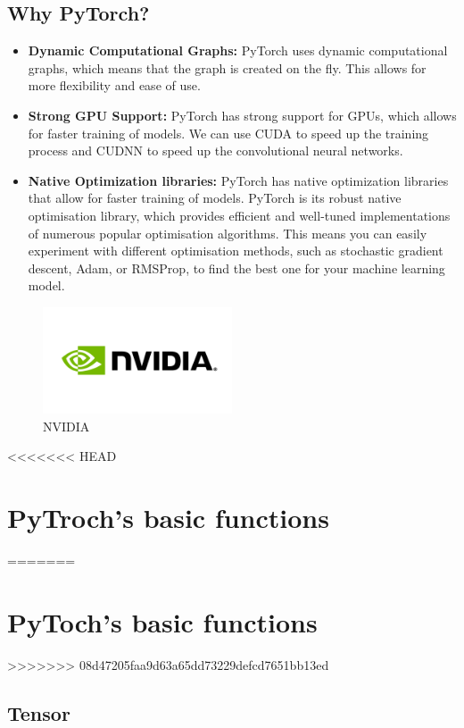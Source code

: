 \documentclass[12pt,hyperref,a4paper,UTF8]{article}
\begin{document}
\subsection{Why PyTorch?}
\begin{itemize}
    \item \textbf{Dynamic Computational Graphs:} PyTorch uses dynamic computational graphs, which means that the graph is created on the fly. This allows for more flexibility and ease of use.
    \item \textbf{Strong GPU Support:} PyTorch has strong support for GPUs, which allows for faster training of models. We can use CUDA to speed up the training process and CUDNN to speed up the convolutional neural networks.
    \item \textbf{Native Optimization libraries:} PyTorch has native optimization libraries that allow for faster training of models. PyTorch is its robust native optimisation library, which provides efficient and well-tuned implementations of numerous popular optimisation algorithms. This means you can easily experiment with different optimisation methods, such as stochastic gradient descent, Adam, or RMSProp, to find the best one for your machine learning model.
\end{itemize}
\begin{figure}[h]
    \centering
    \includegraphics[width=0.5\textwidth]{figures/nvidia-logo.png}
    \caption{NVIDIA}
\end{figure}


<<<<<<< HEAD
\section{PyTroch's basic functions}
=======
\section{PyToch's basic functions}
>>>>>>> 08d47205faa9d63a65dd73229defcd7651bb13ed

\subsection{Tensor}
\end{document}
